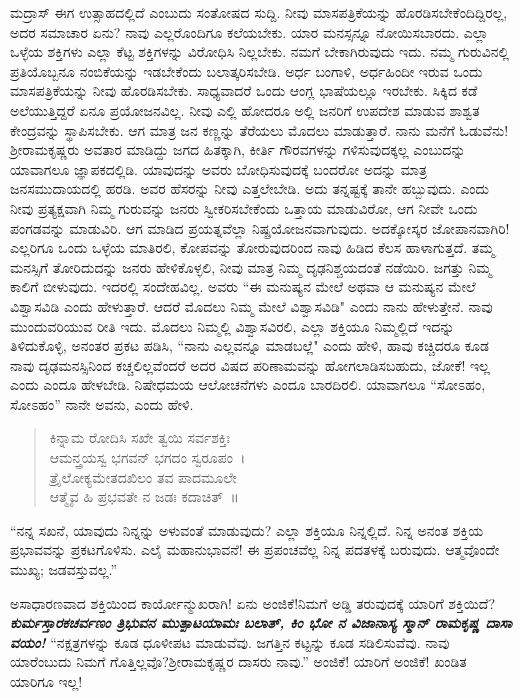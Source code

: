 ಮದ್ರಾಸ್ ಈಗ ಉತ್ಸಾಹದಲ್ಲಿದೆ ಎಂಬುದು ಸಂತೋಷದ ಸುದ್ದಿ. ನೀವು ಮಾಸಪತ್ರಿಕೆಯನ್ನು ಹೊರಡಿಸಬೇಕೆಂದಿದ್ದಿರಲ್ಲ, ಅದರ ಸಮಾಚಾರ ಏನು? ನಾವು ಎಲ್ಲರೊಂದಿಗೂ ಕಲೆಯಬೇಕು. ಯಾರ ಮನಸ್ಸನ್ನೂ ನೋಯಿಸಬಾರದು. ಎಲ್ಲಾ ಒಳ್ಳೆಯ ಶಕ್ತಿಗಳು ಎಲ್ಲಾ ಕೆಟ್ಟ ಶಕ್ತಿಗಳನ್ನು ವಿರೋಧಿಸಿ ನಿಲ್ಲಬೇಕು. ನಮಗೆ ಬೇಕಾಗಿರುವುದು ಇದು. ನಮ್ಮ ಗುರುವಿನಲ್ಲಿ ಪ್ರತಿಯೊಬ್ಬನೂ ನಂಬಿಕೆಯನ್ನು ಇಡಬೇಕೆಂದು ಬಲಾತ್ಕರಿಸಬೇಡಿ. ಅರ್ಧ ಬಂಗಾಳಿ, ಅರ್ಧಹಿಂದೀ ಇರುವ ಒಂದು ಮಾಸಪತ್ರಿಕೆಯನ್ನು ನೀವು ಹೊರಡಿಸಬೇಕು. ಸಾಧ್ಯವಾದರೆ ಒಂದು ಆಂಗ್ಲ ಭಾಷೆಯಲ್ಲೂ ಇರಬೇಕು. ಸಿಕ್ಕಿದ ಕಡೆ ಅಲೆಯುತ್ತಿದ್ದರೆ ಏನೂ ಪ್ರಯೋಜನವಿಲ್ಲ. ನೀವು ಎಲ್ಲಿ ಹೋದರೂ ಅಲ್ಲಿ ಜನರಿಗೆ ಉಪದೇಶ ಮಾಡುವ ಶಾಶ್ವತ ಕೇಂದ್ರವನ್ನು ಸ್ಥಾಪಿಸಬೇಕು. ಆಗ ಮಾತ್ರ ಜನ ಕಣ್ಣನ್ನು ತೆರೆಯಲು ಮೊದಲು ಮಾಡುತ್ತಾರೆ. ನಾನು ಮನೆಗೆ ಓಡುವೆನು! ಶ‍್ರೀರಾಮಕೃಷ್ಣರು ಅವತಾರ ಮಾಡಿದ್ದು ಜಗದ ಹಿತಕ್ಕಾಗಿ, ಕೀರ್ತಿ ಗೌರವಗಳನ್ನು ಗಳಿಸುವುದಕ್ಕಲ್ಲ ಎಂಬುದನ್ನು ಯಾವಾಗಲೂ ಜ್ಞಾಪಕದಲ್ಲಿಡಿ. ಯಾವುದನ್ನು ಅವರು ಬೋಧಿಸುವುದಕ್ಕೆ ಬಂದರೋ ಅದನ್ನು ಮಾತ್ರ ಜನಸಮುದಾಯದಲ್ಲಿ ಹರಡಿ. ಅವರ ಹೆಸರನ್ನು ನೀವು ಎತ್ತಲೇಬೇಡಿ. ಅದು ತನ್ನಷ್ಟಕ್ಕೆ ತಾನೇ ಹಬ್ಬುವುದು. ಎಂದು ನೀವು ಪ್ರತ್ಯಕ್ಷವಾಗಿ ನಿಮ್ಮ ಗುರುವನ್ನು ಜನರು ಸ್ವೀಕರಿಸಬೇಕೆಂದು ಒತ್ತಾಯ ಮಾಡುವಿರೋ, ಆಗ ನೀವೇ ಒಂದು ಪಂಗಡವನ್ನು ಮಾಡುವಿರಿ. ಆಗ ಮಾಡಿದ ಪ್ರಯತ್ನವೆಲ್ಲಾ ನಿಷ್ಪ್ರಯೋಜನವಾಗುವುದು. ಅದಕ್ಕೋಸ್ಕರ ಜೋಪಾನವಾಗಿರಿ!ಎಲ್ಲರಿಗೂ ಒಂದು ಒಳ್ಳೆಯ ಮಾತಿರಲಿ, ಕೋಪವನ್ನು ತೋರುವುದರಿಂದ ನಾವು ಹಿಡಿದ ಕೆಲಸ ಹಾಳಾಗುತ್ತದೆ. ತಮ್ಮ ಮನಸ್ಸಿಗೆ ತೋರಿದುದನ್ನು ಜನರು ಹೇಳಿಕೊಳ್ಳಲಿ, ನೀವು ಮಾತ್ರ ನಿಮ್ಮ ದೃಢನಿಶ್ಚಯದಂತೆ ನಡೆಯಿರಿ. ಜಗತ್ತು ನಿಮ್ಮ ಕಾಲಿಗೆ ಬೀಳುವುದು. ಇದರಲ್ಲಿ ಸಂದೇಹವಿಲ್ಲ. ಅವರು ``ಈ ಮನುಷ್ಯನ ಮೇಲೆ ಅಥವಾ ಆ ಮನುಷ್ಯನ ಮೇಲೆ ವಿಶ್ವಾಸವಿಡಿ ಎಂದು ಹೇಳುತ್ತಾರೆ. ಆದರೆ ಮೊದಲು ನಿಮ್ಮ ಮೇಲೆ ವಿಶ್ವಾಸವಿಡಿ" ಎಂದು ನಾನು ಹೇಳುತ್ತೇನೆ. ನಾವು ಮುಂದುವರಿಯುವ ರೀತಿ ಇದು. ಮೊದಲು ನಿಮ್ಮಲ್ಲಿ ವಿಶ್ವಾಸವಿರಲಿ, ಎಲ್ಲಾ ಶಕ್ತಿಯೂ ನಿಮ್ಮಲ್ಲಿದೆ \enginline{-}ಇದನ್ನು ತಿಳಿದುಕೊಳ್ಳಿ, ಅನಂತರ ಪ್ರಕಟ ಪಡಿಸಿ, ``ನಾನು ಎಲ್ಲವನ್ನೂ ಮಾಡಬಲ್ಲೆ" ಎಂದು ಹೇಳಿ, ಹಾವು ಕಚ್ಚಿದರೂ ಕೂಡ ನಾವು ದೃಢಮನಸ್ಸಿನಿಂದ ಕಚ್ಚಲಿಲ್ಲವೆಂದರೆ ಅದರ ವಿಷದ ಪರಿಣಾಮವನ್ನು ಹೋಗಲಾಡಿಸಬಹುದು, ಜೋಕೆ! ಇಲ್ಲ ಎಂದು ಎಂದೂ ಹೇಳಬೇಡಿ. ನಿಷೇಧಮಯ ಆಲೋಚನೆಗಳು ಎಂದೂ ಬಾರದಿರಲಿ. ಯಾವಾಗಲೂ ``ಸೋಽಹಂ, ಸೋಽಹಂ'' ನಾನೇ ಅವನು, ಎಂದು ಹೇಳಿ.

\begin{verse}
 ಕಿನ್ನಾಮ ರೋದಿಸಿ ಸಖೇ ತ್ವಯಿ ಸರ್ವಶಕ್ತಿಃ\\
 ಆಮನ್ತ್ರಯಸ್ವ ಭಗವನ್ ಭಗದಂ ಸ್ವರೂಪಂ~।\\
 ತ್ರೈಲೋಕ್ಯಮೇತದಖಿಲಂ ತವ ಪಾದಮೂಲೇ\\
 ಆತ್ಮೈವ ಹಿ ಪ್ರಭವತೇ ನ ಜಡಃ ಕದಾಚಿತ್~॥ 
\end{verse}

``ನನ್ನ ಸಖನೆ, ಯಾವುದು ನಿನ್ನನ್ನು ಅಳುವಂತೆ ಮಾಡುವುದು? ಎಲ್ಲಾ ಶಕ್ತಿಯೂ ನಿನ್ನಲ್ಲಿದೆ. ನಿನ್ನ ಅನಂತ ಶಕ್ತಿಯ ಪ್ರಭಾವವನ್ನು ಪ್ರಕಟಗೊಳಿಸು. ಎಲೈ ಮಹಾನುಭಾವನೆ! ಈ ಪ್ರಪಂಚವೆಲ್ಲ ನಿನ್ನ ಪದತಳಕ್ಕೆ ಬರುವುದು. ಆತ್ಮವೊಂದೇ ಮುಖ್ಯ; ಜಡವಸ್ತುವಲ್ಲ.”

ಅಸಾಧಾರಣವಾದ ಶಕ್ತಿಯಿಂದ ಕಾರ್ಯೋನ್ಮುಖರಾಗಿ! ಏನು ಅಂಜಿಕೆ!ನಿಮಗೆ ಅಡ್ಡಿ ತರುವುದಕ್ಕೆ ಯಾರಿಗೆ ಶಕ್ತಿಯಿದೆ? \textbf{\textit{ಕುರ್ಮಸ್ತಾರಕಚರ್ವಣಂ ತ್ರಿಭುವನ ಮುತ್ಪಾಟಯಾಮಃ ಬಲಾತ್, ಕಿಂ ಭೋ ನ ವಿಜಾನಾಸ್ಯ ಸ್ಮಾನ್ ರಾಮಕೃಷ್ಣ ದಾಸಾ ವಯಂ!}} ``ನಕ್ಷತ್ರಗಳನ್ನು ಕೂಡ ಧೂಳೀಪಟ ಮಾಡುವೆವು. ಜಗತ್ತಿನ ಕಟ್ಟನ್ನು ಕೂಡ ಸಡಿಲಿಸುವೆವು. ನಾವು ಯಾರೆಂಬುದು ನಿಮಗೆ ಗೊತ್ತಿಲ್ಲವೊ?ಶ‍್ರೀರಾಮಕೃಷ್ಣರ ದಾಸರು ನಾವು.” ಅಂಜಿಕೆ! ಯಾರಿಗೆ ಅಂಜಿಕೆ! ಖಂಡಿತ ಯಾರಿಗೂ ಇಲ್ಲ!

